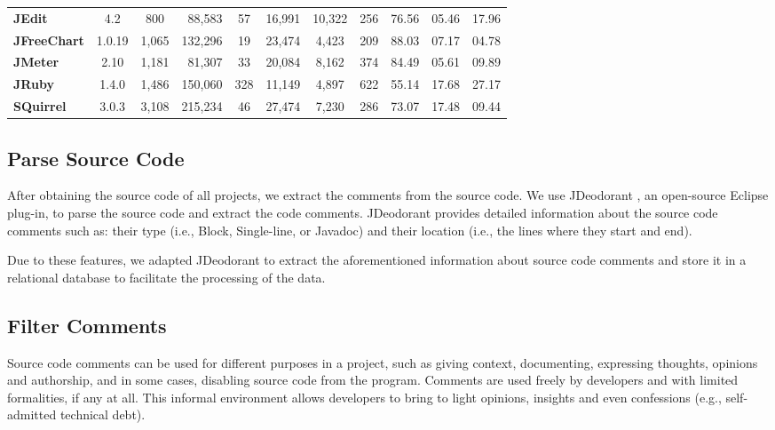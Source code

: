 \begin{table}[thb!]
\begin{center}
\begin{tabular}{l| c c r c || c c c || c c c}
            \textbf{JEdit}          & 4.2      &   800 &  88,583 & 57  & 16,991 &  10,322 &    256 &  76.56  & 05.46  & 17.96 \\
            \textbf{JFreeChart}     & 1.0.19   & 1,065 & 132,296 & 19  & 23,474 &   4,423 &    209 &  88.03  & 07.17  & 04.78 \\
            \textbf{JMeter}         & 2.10     & 1,181 &  81,307 & 33  & 20,084 &   8,162 &    374 &  84.49  & 05.61  & 09.89 \\
            \textbf{JRuby}          & 1.4.0    & 1,486 & 150,060 & 328 & 11,149 &   4,897 &    622 &  55.14  & 17.68  & 27.17 \\ 
            \textbf{SQuirrel}       & 3.0.3    & 3,108 & 215,234 & 46  & 27,474 &   7,230 &    286 &  73.07  & 17.48  & 09.44 \\ 
            \bottomrule             
        \end{tabular}
    \end{center}
\end{table}

\subsection{Parse Source Code} 
\label{sub:parse_source_code}

After obtaining the source code of all projects, we extract the comments from the source code. We use JDeodorant \cite{Tsantalis2008CSMR}, an open-source Eclipse plug-in, to parse the source code and extract the code comments. JDeodorant provides detailed information about the source code comments such as: their type (i.e., Block, Single-line, or Javadoc) and their location (i.e., the lines where they start and end).  

Due to these features, we adapted JDeodorant to extract the aforementioned information about source code comments and store it in a relational database to facilitate the processing of the data. 

\subsection{Filter Comments} 
\label{sub:filter_comments}

Source code comments can be used for different purposes in a project, such as giving context, documenting, expressing thoughts, opinions and authorship, and in some cases, disabling source code from the program. Comments are used freely by developers and with limited formalities, if any at all. This informal environment allows developers to bring to light opinions, insights and even confessions (e.g., self-admitted technical debt). 

